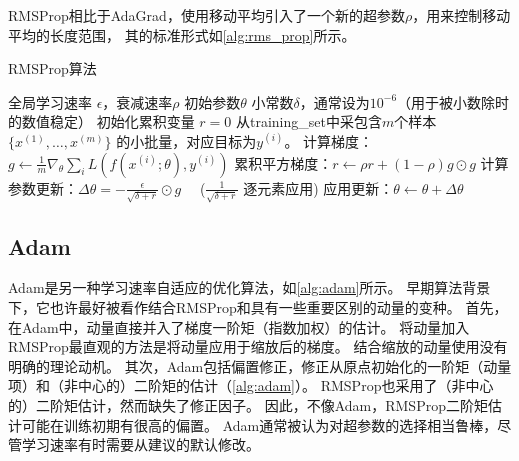 RMSProp相比于AdaGrad，使用移动平均引入了一个新的超参数$\rho$，用来控制移动平均的长度范围，
其的标准形式如\ref{alg:rms_prop}所示。\par

\begin{algorithm}[ht]
	\caption{RMSProp算法}
	\label{alg:rms_prop}
	\begin{algorithmic}
		\REQUIRE 全局学习速率 $\epsilon$，衰减速率$\rho$
		\REQUIRE  初始参数$\theta$
		\REQUIRE 小常数$\delta$，通常设为$10^{-6}$（用于被小数除时的数值稳定）
		\STATE 初始化累积变量 $r = 0$
		\STATE 从\gls{training_set}中采包含$m$个样本$\{ x^{(1)},\dots, x^{(m)}\}$ 的小批量，对应目标为$y^{(i)}$。
		\STATE 计算梯度：$g \leftarrow  
		\frac{1}{m} \nabla_{\theta} \sum_i L(f(x^{(i)};\theta),y^{(i)})$ 
		\STATE 累积平方梯度：$r \leftarrow \rho
		r + (1-\rho) g \odot g$
		\STATE 计算参数更新：$\Delta \theta =
		-\frac{\epsilon}{\sqrt{\delta + r}} \odot g$  \ \  ($\frac{1}{\sqrt{\delta + r}}$ 逐元素应用)
		\STATE 应用更新：$\theta \leftarrow \theta + \Delta \theta$
		\ENDWHILE
	\end{algorithmic}
\end{algorithm}

\subsection{Adam}
\label{sec:adam}
Adam是另一种学习速率自适应的优化算法，如\ref{alg:adam}所示。
早期算法背景下，它也许最好被看作结合RMSProp和具有一些重要区别的动量的变种。
首先，在Adam中，动量直接并入了梯度一阶矩（指数加权）的估计。
将动量加入RMSProp最直观的方法是将动量应用于缩放后的梯度。
结合缩放的动量使用没有明确的理论动机。
其次，Adam包括偏置修正，修正从原点初始化的一阶矩（动量项）和（非中心的）二阶矩的估计（\ref{alg:adam}）。
RMSProp也采用了（非中心的）二阶矩估计，然而缺失了修正因子。
因此，不像Adam，RMSProp二阶矩估计可能在训练初期有很高的偏置。
Adam通常被认为对超参数的选择相当鲁棒，尽管学习速率有时需要从建议的默认修改。\par

